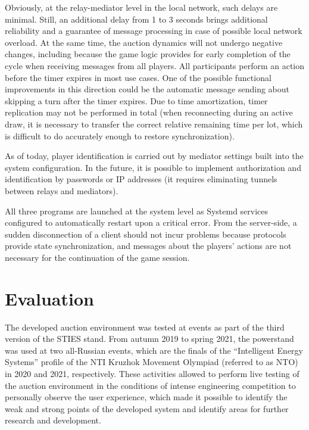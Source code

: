 \documentclass[
]{ceurart}
\begin{document}
Obviously, at the relay-mediator level in the local network, such delays are minimal. Still, an additional delay from 1 to 3 seconds brings additional reliability and a guarantee of message processing in case of possible local network overload. At the same time, the auction dynamics will not undergo negative changes, including because the game logic provides for early completion of the cycle when receiving messages from all players. All participants perform an action before the timer expires in most use cases. One of the possible functional improvements in this direction could be the automatic message sending about skipping a turn after the timer expires. Due to time amortization, timer replication may not be performed in total (when reconnecting during an active draw, it is necessary to transfer the correct relative remaining time per lot, which is difficult to do accurately enough to restore synchronization).

As of today, player identification is carried out by mediator settings built into the system configuration. In the future, it is possible to implement authorization and identification by passwords or IP addresses (it requires eliminating tunnels between relays and mediators).

All three programs are launched at the system level as Systemd services configured to automatically restart upon a critical error. From the server-side, a sudden disconnection of a client should not incur problems because protocols provide state synchronization, and messages about the players’ actions are not necessary for the continuation of the game session.

\section{Evaluation}
\label{sec:eval}

The developed auction environment was tested at events as part of the third version of the STIES stand. From autumn 2019 to spring 2021, the powerstand was used at two all-Russian events, which are the finals of the ``Intelligent Energy Systems'' profile of the NTI Kruzhok Movement Olympiad (referred to as NTO) in 2020 and 2021, respectively. These activities allowed to perform live testing of the auction environment in the conditions of intense engineering competition to personally observe the user experience, which made it possible to identify the weak and strong points of the developed system and identify areas for further research and development.
\end{document}
